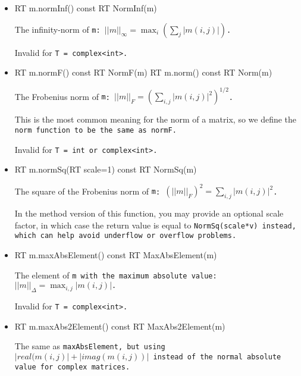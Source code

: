 \begin{itemize}
\item
\begin{tmvcode}
RT m.normInf() const
RT NormInf(m)
\end{tmvcode}
The infinity-norm of \tt{m}: 
$||m||_\infty = \max_i (\sum_j |m(i,j)|)$.  

Invalid for \tt{T = complex<int>}.

\item
\begin{tmvcode}
RT m.normF() const
RT NormF(m)
RT m.norm() const
RT Norm(m)
\end{tmvcode}
The Frobenius norm of \tt{m}: 
$||m||_F = (\sum_{i,j} |m(i,j)|^2)^{1/2}$.  

This is the most common meaning for the norm of a matrix, so we
define the \tt{norm} function to be the same as \tt{normF}.

Invalid for \tt{T = int} or \tt{complex<int>}.

\item
\begin{tmvcode}
RT m.normSq(RT scale=1) const
RT NormSq(m)
\end{tmvcode}
The square of the Frobenius norm of \tt{m}: 
$(||m||_F)^2 = \sum_{i,j} |m(i,j)|^2$.

In the method version of this function, you may provide an optional scale factor,
in which case the return value is equal to \tt{NormSq(scale*v)} instead, 
which can help avoid underflow or overflow problems.

\item
\begin{tmvcode}
RT m.maxAbsElement() const
RT MaxAbsElement(m)
\end{tmvcode}
The element of \tt{m} with the maximum absolute value: 
$||m||_\Delta = \max_{i,j} |m(i,j)|$.  

Invalid for \tt{T = complex<int>}.

\item
\begin{tmvcode}
RT m.maxAbs2Element() const
RT MaxAbs2Element(m)
\end{tmvcode}
The same as \tt{maxAbsElement}, but using $|real(m(i,j)| + |imag(m(i,j))|$ instead
of the normal absolute value for complex matrices.


\end{itemize}
